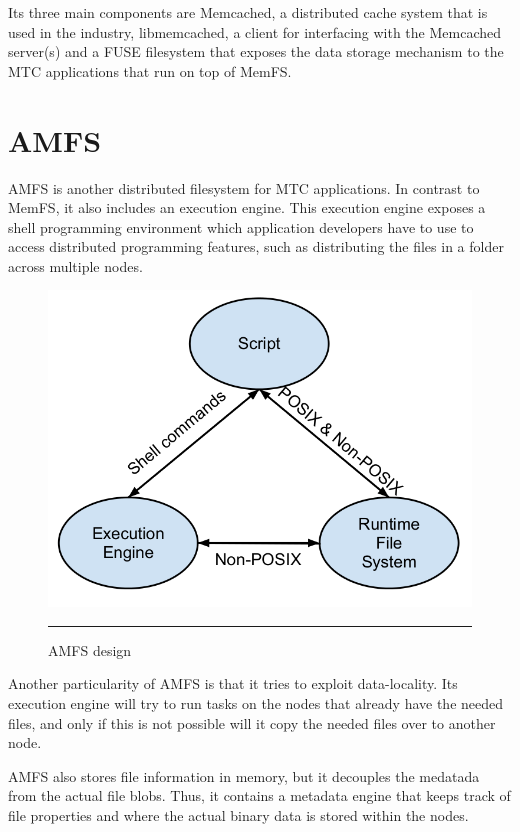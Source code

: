 Its three main components are Memcached\cite{memcached}, a distributed cache system that is used in the industry, libmemcached\cite{libmemcached}, a client for interfacing with the Memcached server(s) and a FUSE\cite{fuse} filesystem that exposes the data storage mechanism to the MTC applications that run on top of MemFS.


\section{AMFS}

AMFS\cite{amfs} is another distributed filesystem for MTC applications. In contrast to MemFS, it also includes an execution engine. This execution engine exposes a shell programming environment which application developers have to use to access distributed programming features, such as distributing the files in a folder across multiple nodes.

\begin{figure}[H]
  \centering
    \includegraphics[scale=0.35]{Figures/amfs.png}
    \rule{25em}{0.5pt}
  \caption[AMFS design]{AMFS design}
  \label{fig:amfs}
\end{figure}

Another particularity of AMFS is that it tries to exploit data-locality. Its execution engine will try to run tasks on the nodes that already have the needed files, and only if this is not possible will it copy the needed files over to another node.

AMFS also stores file information in memory, but it decouples the medatada from the actual file blobs. Thus, it contains a metadata engine that keeps track of file properties and where the actual binary data is stored within the nodes.

